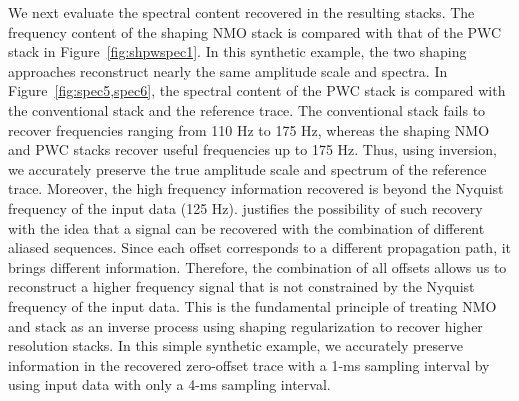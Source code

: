 
We next evaluate the spectral content recovered in the resulting stacks. The frequency content of the shaping NMO stack is compared
with that of the PWC stack in Figure~\ref{fig:shpwspec1}. 
In this synthetic example, the two shaping approaches reconstruct nearly the same amplitude scale and spectra. In Figure~\ref{fig:spec5,spec6},
the spectral content of the PWC stack is compared with the conventional stack and the reference 
trace. The conventional stack fails to recover frequencies ranging 
from 110 Hz to 175 Hz, whereas the shaping NMO and PWC stacks recover useful frequencies up to 175 Hz. Thus, using inversion, we 
accurately preserve the true amplitude scale and spectrum of the reference trace.
Moreover, the high frequency information recovered is beyond
the Nyquist frequency of the input data (125 Hz). \cite{ronen2} justifies the possibility of such recovery with the
idea that a signal can be recovered with the combination of different aliased sequences. Since each offset
corresponds to a different propagation path, it brings different information. Therefore,
the combination of all offsets allows us to reconstruct a higher frequency signal that is not constrained
by the Nyquist frequency of the input data. This is the fundamental principle of treating NMO and stack as an 
inverse process using shaping regularization to recover higher resolution stacks. In this simple synthetic example, 
we accurately preserve information in the recovered zero-offset trace with a 1-ms sampling 
interval by using input data with only a 4-ms sampling interval. 


	
